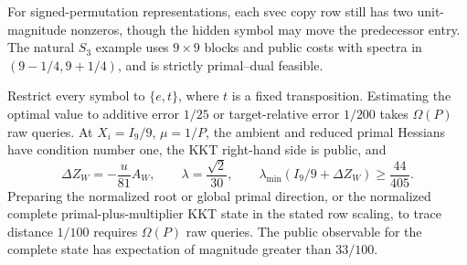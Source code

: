 For signed-permutation representations, each svec copy row still has two
unit-magnitude nonzeros, though the hidden symbol may move the predecessor
entry.  The natural $S_3$ example uses
$9\times9$ blocks and public costs with spectra in $(9-1/4,9+1/4)$, and
is strictly primal--dual feasible.

\begin{theorem}
\label{thm:sdp-s3-hardness}
Restrict every symbol to $\{e,t\}$, where $t$ is a fixed transposition.
Estimating the optimal value to additive error $1/25$ or target-relative
error $1/200$ takes $\Omega(P)$ raw queries.  At $X_i=I_9/9$, $\mu=1/P$, the ambient and reduced primal Hessians
have condition number one, the KKT right-hand side is public, and
\begin{equation}
 \Delta Z_W=-\frac{u}{81}A_W,\qquad
 \lambda=\frac{\sqrt2}{30},\qquad
 \lambda_{\min}(I_9/9+\Delta Z_W)\geq\frac{44}{405}.       \label{eq:sdp-s3-newton-constants}
\end{equation}
Preparing the normalized root or global primal direction, or the normalized
complete primal-plus-multiplier KKT state in the stated row scaling, to trace
distance $1/100$ requires $\Omega(P)$ raw queries.  The public observable
for the complete state has expectation of magnitude greater than
$33/100$.
\end{theorem}

